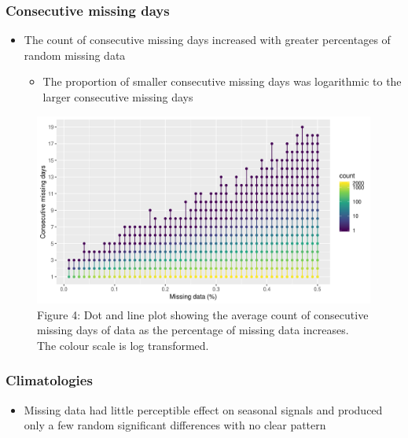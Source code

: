 \documentclass[]{article}
\providecommand{\tightlist}{%
  \setlength{\itemsep}{0pt}\setlength{\parskip}{0pt}}
\begin{document}
\subsubsection{Consecutive missing days}\label{consecutive-missing-days}

\begin{itemize}
\tightlist
\item
  The count of consecutive missing days increased with greater
  percentages of random missing data

  \begin{itemize}
  \tightlist
  \item
    The proportion of smaller consecutive missing days was logarithmic
    to the larger consecutive missing days
  \end{itemize}
\end{itemize}

\begin{figure}
\centering
\includegraphics{../docs/articles/missing_data_files/figure-html/con-miss-1.png}
\caption{Figure 4: Dot and line plot showing the average count of
consecutive missing days of data as the percentage of missing data
increases. The colour scale is log transformed.}
\end{figure}

\subsubsection{Climatologies}\label{climatologies-1}

\begin{itemize}
\tightlist
\item
  Missing data had little perceptible effect on seasonal signals and
  produced only a few random significant differences with no clear
  pattern
\end{itemize}
\end{document}
